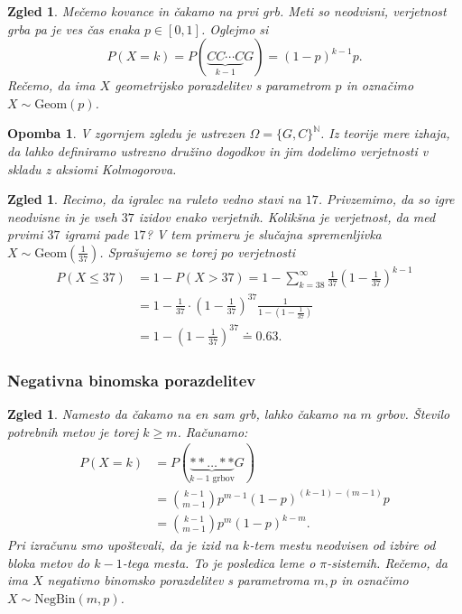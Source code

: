 \documentclass[10pt, a4paper]{article}
\newtheorem*{opomba}{Opomba}
\newtheorem{zgled}[izr]{Zgled}
\newcommand{\N}{\mathbb {N}}
\begin{document}
\begin{zgled}
  Mečemo kovance in čakamo na prvi grb. Meti so neodvisni,
verjetnost grba pa je ves čas enaka $p \in [0, 1]$.
Oglejmo si $$P(X = k) = P(\underbrace{CC\cdots C}_{k - 1} G) = (1 - p)^{k - 1} p.$$
Rečemo, da ima $X$ geometrijsko porazdelitev s parametrom $p$ in označimo $X \sim \mathrm{Geom}(p)$.
\end{zgled}

\begin{opomba}
  V zgornjem zgledu je ustrezen $\Omega = \{G, C\}^{\N}$.
  Iz teorije mere izhaja, da lahko definiramo ustrezno družino dogodkov in 
  jim dodelimo verjetnosti v skladu z aksiomi Kolmogorova.
\end{opomba}

\begin{zgled}
  Recimo, da igralec na ruleto vedno stavi na $17$. Privzemimo, da so igre neodvisne 
  in je vseh $37$ izidov enako verjetnih.
  Kolikšna je verjetnost, da med prvimi $37$ igrami pade $17$?
  V tem primeru je slučajna spremenljivka $X \sim \mathrm{Geom} \left(\frac{1}{37}\right)$.
  Sprašujemo se torej po verjetnosti 
  \begin{align*}
    P(X \leq 37) &= 1 - P(X > 37) = 1 - \sum_{k = 38} ^\infty \frac{1}{37} \left(1 - \frac{1}{37}\right)^{k - 1}\\
    &= 1 - \frac{1}{37} \cdot \left(1 - \frac{1}{37}\right)^{37} \frac{1}{1 - \left(1 - \frac{1}{37}\right)}\\
    &= 1 - \left(1 - \frac{1}{37}\right)^{37} \doteq 0.63.
  \end{align*}
\end{zgled}

\subsubsection*{Negativna binomska porazdelitev}

\begin{zgled}
  Namesto da čakamo na en sam grb, lahko čakamo na $m$ grbov.
  Število potrebnih metov je torej $k \geq m$. Računamo:
  \begin{align*}
    P(X = k) &= P(\underbrace{** \dots **}_{\text{$k - 1$ grbov}} G)\\
    &= \binom{k - 1}{m - 1} p^{m - 1} (1 - p)^{(k - 1) - (m - 1)} p\\
    &= \binom{k - 1}{m - 1} p^m (1 - p)^{k - m}. 
  \end{align*}
  Pri izračunu smo upoštevali, da je izid na $k$-tem mestu neodvisen od izbire 
  od bloka metov do $k - 1$-tega mesta. To je posledica leme o $\pi$-sistemih.
  Rečemo, da ima $X$ negativno binomsko porazdelitev s parametroma $m, p$ 
  in označimo $X \sim \mathrm{NegBin} (m, p)$.  
\end{zgled}
\end{document}
